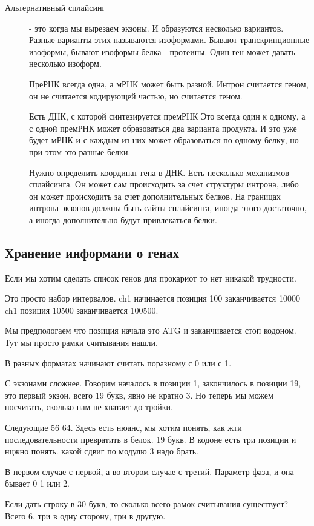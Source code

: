 \begin{description}
\item[Альтернативный сплайсинг] - это когда мы вырезаем экзоны. И образуются несколько 
вариантов. Разные варианты этих 
называются изоформами. Бывают транскрипционные изоформы, бывают 
изоформы белка - протеины. Один ген может давать несколько изоформ. 

ПреРНК всегда одна, а мРНК может быть разной. Интрон считается геном, 
он не считается кодирующей частью, но считается геном. 

Есть ДНК, с которой синтезируется премРНК Это всегда один к одному, 
а с одной премРНК может образоваться 
два варианта продукта. И это уже будет мРНК и с каждым из них 
может образоваться по одному белку, но при этом это разные белки. 

Нужно определить координат гена в ДНК. Есть несколько механизмов сплайсинга. 
Он может сам происходить за счет структуры интрона, либо он может происходить за счет дополнительных 
белков. На границах интрона-экзонов должны быть сайты сплайсинга, иногда
этого достаточно, а иногда дополнительно будут привлекаться белки. 

\end{description}

\subsection{Хранение информаии о генах}
Если мы хотим сделать список генов для прокариот то нет 
никакой трудности. 

Это просто набор интервалов. 
ch1 начинается позиция 100 заканчивается 10000
ch1 позиция 10500 заканчивается 100500. 

Мы предпологаем что позиция начала это ATG и заканчивается стоп кодоном. 
Тут мы просто рамки считывания нашли. 

В разных форматах начинают считать поразному с 0 или с 1. 

С экзонами сложнее. 
Говорим началось в позиции 1, закончилось в позиции 19,
это первый экзон, всего
19 букв, явно не кратно 3. Но теперь мы можем
посчитать, сколько нам не хватает до тройки.

Следующие 56 64. Здесь есть нюанс,
мы хотим понять, как жти последовательности превратить в белок.
19 букв. В кодоне есть три позиции и нцжно понять. какой сдвиг
по модулю 3 надо брать.

В первом случае с первой, а во втором случае с третий.
Параметр фаза, и она бывает 0 1 или 2.

Если дать строку в 30 букв, то сколько всего рамок считывания существует?
Всего 6, три в одну сторону, три в другую.

